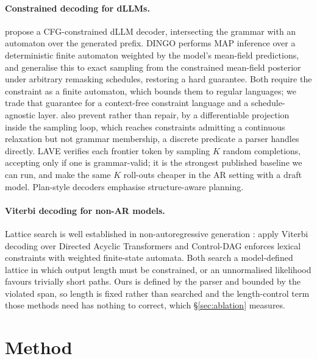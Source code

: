 \documentclass{article}
\begin{document}
\paragraph{Constrained decoding for dLLMs.}
\citet{cd4dllm} propose a CFG-constrained dLLM decoder, intersecting the
grammar with an automaton over the generated prefix. DINGO
\citep{suresh2025dingoconstrainedinferencediffusion} performs MAP inference over
a deterministic finite automaton weighted by the model's mean-field predictions,
and \citet{dang2026fadllm} generalise this to exact sampling from the
constrained mean-field posterior under arbitrary remasking schedules, restoring
a hard guarantee. Both require the constraint as a finite automaton, which
bounds them to regular languages; we trade that guarantee for a context-free
constraint language and a schedule-agnostic layer. \citet{cardei2025constraineddiscretediffusion} also prevent rather than repair,
by a differentiable projection inside the sampling loop, which reaches
constraints admitting a continuous relaxation but not grammar membership, a
discrete predicate a parser handles directly. LAVE
\citep{zhang2026lookaheadthenverifyreliableconstraineddecoding} verifies each
frontier token by sampling $K$ random completions, accepting only if one is
grammar-valid; it is the strongest published baseline we can run, and
\citet{nakshatri2025speculative} make the same $K$ roll-outs cheaper in the AR
setting with a draft model. Plan-style decoders
\citep{li2026planverifyfillstructured} emphasise structure-aware planning.

\paragraph{Viterbi decoding for non-AR models.}
Lattice search is well established in non-autoregressive generation \citep{deng2021sequence}: \citet{shao2022viterbi} apply Viterbi decoding over Directed Acyclic Transformers and Control-DAG \citep{chen2024controldag} enforces lexical constraints with weighted finite-state automata. Both search a model-defined lattice in which output length must be constrained, or an unnormalised likelihood favours trivially short paths. Ours is defined by the parser and bounded by the violated span, so length is fixed rather than searched and the length-control term those methods need has nothing to correct, which \S\ref{sec:ablation} measures.

\section{Method}
\label{sec:method}
\end{document}
